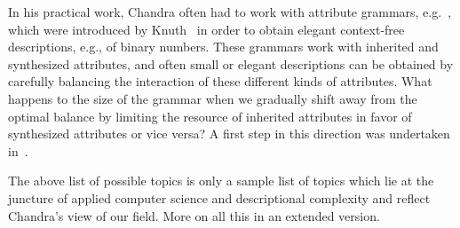 \documentclass[copyright]{eptcs}
\begin{document}
In his practical work, Chandra often had to work with attribute grammars, e.g.~\cite{Kintala83}, which were introduced by
Knuth~\cite{Knuth68} in order to obtain elegant context-free descriptions, e.g., of binary numbers. These grammars work with 
inherited and synthesized attributes, and often small or elegant descriptions can be obtained by carefully balancing the 
interaction of these different kinds of attributes. What happens to the size of the grammar when we gradually shift away 
from the optimal balance by limiting the resource of inherited attributes in favor of synthesized attributes or vice versa? A first step in this direction was undertaken in~\cite{Sunckel98}. 

The above list of possible topics is only a sample list of topics which lie at the juncture of applied computer science and 
descriptional complexity and reflect Chandra's view of our field. More on all this in an extended version.
\end{document}
